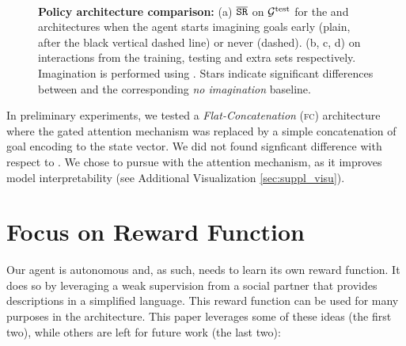 \begin{figure}[!h]
    \centering
     \\
    \caption{\textbf{Policy architecture comparison: } (a) $\overline{\mathtt{SR}}$ on $\mathcal{G}^{\text{test}}$ for the \FA and \MA architectures when the agent starts imagining goals early (plain, after the black vertical dashed line) or never (dashed). (b, c, d) \itwoc on interactions from the training, testing and extra sets respectively. Imagination is performed using \CGH. Stars indicate significant differences between \CGH and the corresponding \textit{no imagination} baseline.
    \label{fig:suppl_ma_fa_comparison}}
\end{figure}


In preliminary experiments, we tested a \textit{Flat-Concatenation} (\textsc{fc}\xspace) architecture where the gated attention mechanism was replaced by a simple concatenation of goal encoding to the state vector. We did not found signficant difference with respect to \FA. We chose to pursue with the attention mechanism, as it improves model interpretability (see Additional Visualization \ref{sec:suppl_visu}).



\clearpage
\section{Focus on Reward Function}
\label{sec:suppl_reward}
Our \imagine agent is autonomous and, as such, needs to learn its own reward function. It does so by leveraging a weak supervision from a social partner that provides descriptions in a simplified language. This reward function can be used for many purposes in the architecture. This paper leverages some of these ideas (the first two), while others are left for future work (the last two):

